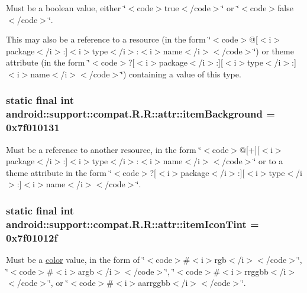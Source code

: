 Must be a boolean value, either \char`\"{}$<$code$>$true$<$/code$>$\char`\"{} or \char`\"{}$<$code$>$false$<$/code$>$\char`\"{}. 

This may also be a reference to a resource (in the form \char`\"{}$<$code$>$@\mbox{[}$<$i$>$package$<$/i$>$:\mbox{]}$<$i$>$type$<$/i$>$:$<$i$>$name$<$/i$>$$<$/code$>$\char`\"{}) or theme attribute (in the form \char`\"{}$<$code$>$?\mbox{[}$<$i$>$package$<$/i$>$:\mbox{]}\mbox{[}$<$i$>$type$<$/i$>$:\mbox{]}$<$i$>$name$<$/i$>$$<$/code$>$\char`\"{}) containing a value of this type. \hypertarget{classandroid_1_1support_1_1compat_1_1_r_1_1attr_887d5c1816770fe6eea655d8665326cc}{
\subsubsection[{itemBackground}]{\setlength{\rightskip}{0pt plus 5cm}static final int android::support::compat.R.R::attr::itemBackground = 0x7f010131}}
\label{classandroid_1_1support_1_1compat_1_1_r_1_1attr_887d5c1816770fe6eea655d8665326cc}


Must be a reference to another resource, in the form \char`\"{}$<$code$>$@\mbox{[}+\mbox{]}\mbox{[}$<$i$>$package$<$/i$>$:\mbox{]}$<$i$>$type$<$/i$>$:$<$i$>$name$<$/i$>$$<$/code$>$\char`\"{} or to a theme attribute in the form \char`\"{}$<$code$>$?\mbox{[}$<$i$>$package$<$/i$>$:\mbox{]}\mbox{[}$<$i$>$type$<$/i$>$:\mbox{]}$<$i$>$name$<$/i$>$$<$/code$>$\char`\"{}. \hypertarget{classandroid_1_1support_1_1compat_1_1_r_1_1attr_5da8f79f1e4e5687d5d1894f969d6976}{
\subsubsection[{itemIconTint}]{\setlength{\rightskip}{0pt plus 5cm}static final int android::support::compat.R.R::attr::itemIconTint = 0x7f01012f}}
\label{classandroid_1_1support_1_1compat_1_1_r_1_1attr_5da8f79f1e4e5687d5d1894f969d6976}


Must be a \hyperlink{classandroid_1_1support_1_1compat_1_1_r_1_1color}{color} value, in the form of \char`\"{}$<$code$>$\#$<$i$>$rgb$<$/i$>$$<$/code$>$\char`\"{}, \char`\"{}$<$code$>$\#$<$i$>$argb$<$/i$>$$<$/code$>$\char`\"{}, \char`\"{}$<$code$>$\#$<$i$>$rrggbb$<$/i$>$$<$/code$>$\char`\"{}, or \char`\"{}$<$code$>$\#$<$i$>$aarrggbb$<$/i$>$$<$/code$>$\char`\"{}. 

